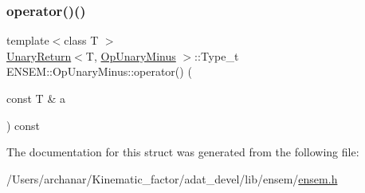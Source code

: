 \mbox{\label{structENSEM_1_1OpUnaryMinus_a34e70d7d677f60520ca94fa732d26926}} 
\subsubsection{\texorpdfstring{operator()()}{operator()()}\hspace{0.1cm}{\footnotesize\ttfamily [2/2]}}
{\footnotesize\ttfamily template$<$class T $>$ \\
\mbox{\hyperlink{structENSEM_1_1UnaryReturn}{Unary\+Return}}$<$T, \mbox{\hyperlink{structENSEM_1_1OpUnaryMinus}{Op\+Unary\+Minus}} $>$\+::Type\+\_\+t E\+N\+S\+E\+M\+::\+Op\+Unary\+Minus\+::operator() (\begin{DoxyParamCaption}\item[{const T \&}]{a }\end{DoxyParamCaption}) const\hspace{0.3cm}{\ttfamily [inline]}}



The documentation for this struct was generated from the following file\+:\begin{DoxyCompactItemize}
\item 
/\+Users/archanar/\+Kinematic\+\_\+factor/adat\+\_\+devel/lib/ensem/\mbox{\hyperlink{lib_2ensem_2ensem_8h}{ensem.\+h}}\end{DoxyCompactItemize}
